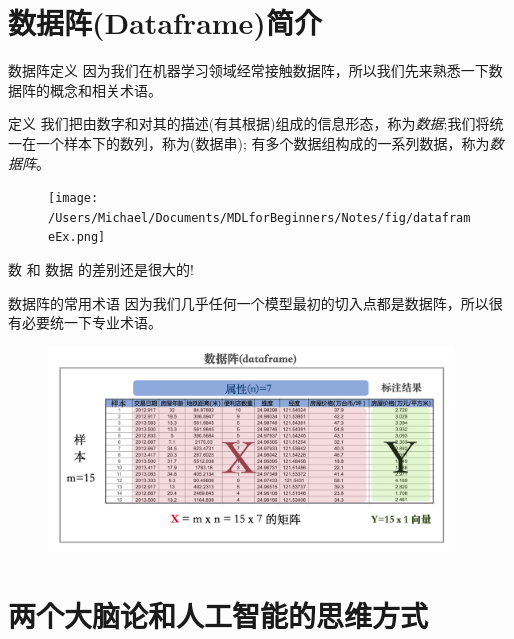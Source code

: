 \documentclass[handout]{ctexbeamer}
\begin{document}
\section{数据阵(Dataframe)简介}

\begin{frame}[fragile]{数据阵定义}
	因为我们在机器学习领域经常接触数据阵，所以我们先来熟悉一下数据阵的概念和相关术语。
		
\begin{block}{定义}
	我们把由数字和对其的描述(有其根据)组成的信息形态，称为\textit{数据};我们将统一在一个样本下的数列，称为(数据串); 有多个数据组构成的一系列数据，称为\textit{数据阵}。
\end{block}
\begin{figure}[H]
	\centering
	\texttt{[image: /Users/Michael/Documents/MDLforBeginners/Notes/fig/dataframeEx.png]}
\end{figure}

数 和 数据 的差别还是很大的!
\end{frame}


\begin{frame}{数据阵的常用术语}
	因为我们几乎任何一个模型最初的切入点都是数据阵，所以很有必要统一下专业术语。
	\begin{figure}[H]
		\centering
		\includegraphics[width=0.96\textwidth]{fig/dataframeVis}
	\end{figure}
\end{frame}

\section{两个大脑论和人工智能的思维方式}
\end{document}
